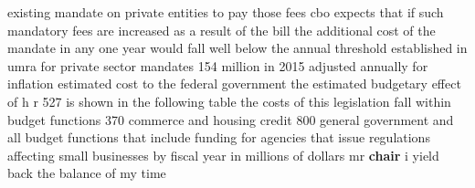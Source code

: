 \documentclass{article}
\begin{document}
existing mandate on private entities to pay those fees cbo expects that if such mandatory fees are increased as a result of the bill the additional cost of the mandate in any one year would fall well below the annual threshold established in umra for private sector mandates 154 million in 2015 adjusted annually for inflation estimated cost to the federal government the estimated budgetary effect of h r 527 is shown in the following table the costs of this legislation fall within budget functions 370 commerce and housing credit 800 general government and all budget functions that include funding for agencies that issue regulations affecting small businesses by fiscal year in millions of dollars
\vspace{8mm}
mr {\bf \color{red} chair} i yield back the balance of my time\pagebreak
\end{document}
